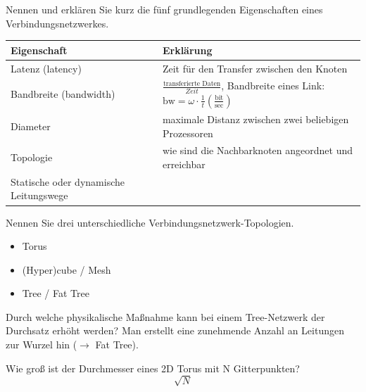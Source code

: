 {
    Nennen und erklären Sie kurz die fünf grundlegenden Eigenschaften eines Verbindungsnetzwerkes.
}
{
    \begin{tabularx}{\textwidth}{|l|X|}
        \toprule
        Eigenschaft            & Erklärung                                                                                                                                           \\
        \midrule
        Latenz (latency)       & Zeit für den Transfer zwischen den Knoten                                                                                                           \\
        \midrule
        Bandbreite (bandwidth) & $\frac{\text{transferierte Daten}}{Zeit}$, Bandbreite eines Link: $\text{bw} = \omega \cdot \frac{1}{t} \left(\frac{\text{bit}}{\text{sec}}\right)$ \\
        \midrule
        Diameter               & maximale Distanz zwischen zwei beliebigen Prozessoren                                                                                               \\
        \midrule
        Topologie              & wie sind die Nachbarknoten angeordnet und erreichbar                                                                                                \\
        \midrule
        Statische oder dynamische Leitungswege                                                                                                                                       \\
        \bottomrule
    \end{tabularx}
}

{
    Nennen Sie drei unterschiedliche Verbindungsnetzwerk-Topologien.
}
{
    \begin{itemize}
        \item Torus
        \item (Hyper)cube / Mesh
        \item Tree / Fat Tree
    \end{itemize}
}

{
    Durch welche physikalische Maßnahme kann bei einem Tree-Netzwerk der Durchsatz erhöht werden?
}
{
    Man erstellt eine zunehmende Anzahl an Leitungen zur Wurzel hin ($\to$ Fat Tree).
}

{
    Wie groß ist der Durchmesser eines 2D Torus mit N Gitterpunkten?
}
{
    $$\sqrt{N}$$
}

